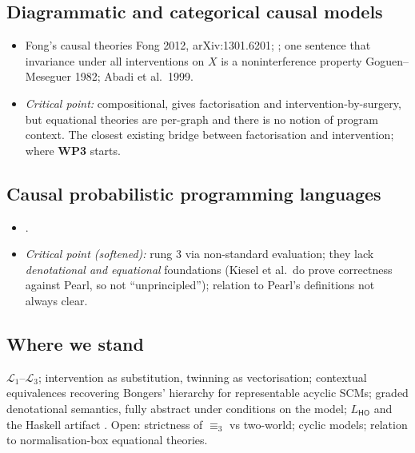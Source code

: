 \documentclass[11pt,a4paper]{article}
\newif\ifskeletonnotes
\newcommand{\budget}[1]{\ifskeletonnotes{\small\color{red!60!black}\textbf{(\textasciitilde#1 words)}}\fi}
\newcommand{\sknew}[1]{\ifskeletonnotes{\color{purple!70!black}[NEW: #1]}\else#1\fi}
\newcommand{\skim}{\ifskeletonnotes{\color{purple!70!black}[SKIM]}\fi}
\newcommand{\WP}[1]{\textbf{WP#1}}
\providecommand{\LHO}{L_{\mathsf{HO}}}
\begin{document}
\subsection{Diagrammatic and categorical causal models}\budget{250}
\begin{itemize}[nosep]
\item Fong's causal theories \sknew{Fong 2012, arXiv:1301.6201}\skim; \cite{jacobs2019causal,lorenz2023causalmodelsstringdiagrams,jacobsszelesstein2025inference,agrawal2026equational,zhang2026semanticseparation}; one sentence that invariance under all interventions on $X$ is a noninterference property \sknew{Goguen--Meseguer 1982; Abadi et al.\ 1999}.
\item \emph{Critical point:} compositional, gives factorisation and intervention-by-surgery, but equational theories are per-graph and there is no notion of program context. The closest existing bridge between factorisation and intervention; where \WP{3} starts.
\end{itemize}
\subsection{Causal probabilistic programming languages}\budget{150}
\begin{itemize}[nosep]
\item \cite{tavares2021language,chirho,perov2020multiverse,bingham2018pyro,abrilpla2023pymc,witty2019synthesis,witty2023bayesian,brule2018whittemore,pywhy,blobaum2024dowhygcm,kiesel2023whatif,lafi-wang}.
\item \emph{Critical point (softened):} rung 3 via non-standard evaluation; they lack \emph{denotational and equational} foundations (Kiesel et al.\ do prove correctness against Pearl, so not ``unprincipled''); relation to Pearl's definitions not always clear.
\end{itemize}
\subsection{Where we stand}\budget{100}
$\mathcal{L}_1$--$\mathcal{L}_3$; intervention as substitution, twinning as vectorisation; contextual equivalences recovering Bongers' hierarchy for representable acyclic SCMs; graded denotational semantics, fully abstract under conditions on the model; $\LHO$ and the Haskell artifact \cite{ARTIFACT_wang_2026_23207221}. Open: strictness of $\equiv_3$ vs two-world; cyclic models; relation to normalisation-box equational theories.
\end{document}
